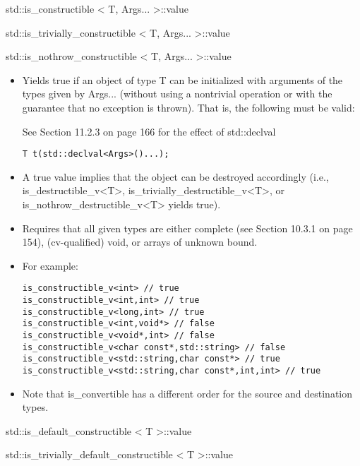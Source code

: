 std::is\_constructible < T, Args... >::value

std::is\_trivially\_constructible < T, Args... >::value

std::is\_nothrow\_constructible < T, Args... >::value

\begin{itemize}
\item 
Yields true if an object of type T can be initialized with arguments of the types given by Args... (without using a nontrivial operation or with the guarantee that no exception is thrown). That is, the following must be valid:

\begin{tcolorbox}[colback=webgreen!5!white,colframe=webgreen!75!black]
\hspace*{0.75cm}See Section 11.2.3 on page 166 for the effect of std::declval
\end{tcolorbox}

\begin{lstlisting}[style=styleCXX]
T t(std::declval<Args>()...);
\end{lstlisting}

\item
A true value implies that the object can be destroyed accordingly (i.e., is\_destructible\_v<T>, is\_trivially\_destructible\_v<T>, or  is\_nothrow\_destructible\_v<T> yields true).

\item
Requires that all given types are either complete (see Section 10.3.1 on page 154), (cv-qualified) void, or arrays of unknown bound.

\item
For example:
\begin{lstlisting}[style=styleCXX]
is_constructible_v<int> // true
is_constructible_v<int,int> // true
is_constructible_v<long,int> // true
is_constructible_v<int,void*> // false
is_constructible_v<void*,int> // false
is_constructible_v<char const*,std::string> // false
is_constructible_v<std::string,char const*> // true
is_constructible_v<std::string,char const*,int,int> // true
\end{lstlisting}

\item
Note that is\_convertible has a different order for the source and destination types.
\end{itemize}

std::is\_default\_constructible < T >::value

std::is\_trivially\_default\_constructible < T >::value

